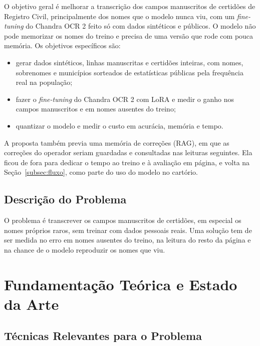 O objetivo geral é melhorar a transcrição dos campos manuscritos de certidões de Registro Civil, principalmente dos nomes que o modelo nunca viu, com um \emph{fine-tuning} do Chandra OCR 2 feito só com dados sintéticos e públicos. O modelo não pode memorizar os nomes do treino e precisa de uma versão que rode com pouca memória. Os objetivos específicos são:
\begin{itemize}
    \item gerar dados sintéticos, linhas manuscritas e certidões inteiras, com nomes, sobrenomes e municípios sorteados de estatísticas públicas pela frequência real na população;
    \item fazer o \emph{fine-tuning} do Chandra OCR 2 com LoRA e medir o ganho nos campos manuscritos e em nomes ausentes do treino;
    \item quantizar o modelo e medir o custo em acurácia, memória e tempo.
\end{itemize}
A proposta também previa uma memória de correções (RAG), em que as correções do operador seriam guardadas e consultadas nas leituras seguintes. Ela ficou de fora para dedicar o tempo ao treino e à avaliação em página, e volta na Seção~\ref{subsec:fluxo}, como parte do uso do modelo no cartório.

\subsection{Descrição do Problema}

O problema é transcrever os campos manuscritos de certidões, em especial os nomes próprios raros, sem treinar com dados pessoais reais. Uma solução tem de ser medida no erro em nomes ausentes do treino, na leitura do resto da página e na chance de o modelo reproduzir os nomes que viu.

\section{Fundamentação Teórica e Estado da Arte}
\label{sec:fundamentacao}

\subsection{Técnicas Relevantes para o Problema}

